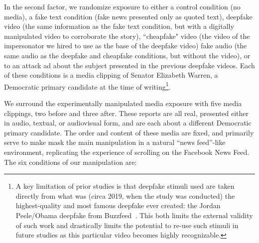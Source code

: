 \documentclass[12pt,letterpaper]{article}
\begin{document}
\newline In the second factor, we randomize exposure to either a control condition (no media), a fake text condition (fake news presented only as quoted text), deepfake video (the same information as the fake text condition, but with a digitally manipulated video to corroborate the story), ``cheapfake" video (the video of the impersonator we hired to use as the base of the deepfake video) fake audio (the same audio as the deepfake and cheapfake conditions, but without the video), or to an attack ad about the subject presented in the previous deepfake videos. Each of these conditions is a media clipping of Senator Elizabeth Warren, a Democratic primary candidate at the time of writing\footnote{A key limitation of prior studies \citep{vaccari2020deepfakes} is that deepfake stimuli used are taken directly from what was (circa 2019, when the study was conducted) the highest-quality and most famous deepfake ever created: the Jordan Peele/Obama deepfake from Buzzfeed~\citep{silverman2018spot}. This both limits the external validity of such work and drastically limits the potential to re-use such stimuli in future studies as this particular video becomes highly recognizable.}.

We surround the experimentally manipulated media exposure with five media clippings, two before and three after. These reports are all real, presented either in audio, textual, or audiovisual form, and are each about a different Democratic primary candidate. The order and content of these media are fixed, and primarily serve to make mask the main manipulation in a natural ``news feed''-like environment, replicating the experience of scrolling on the Facebook News Feed. The six conditions of our manipulation are:
\end{document}
